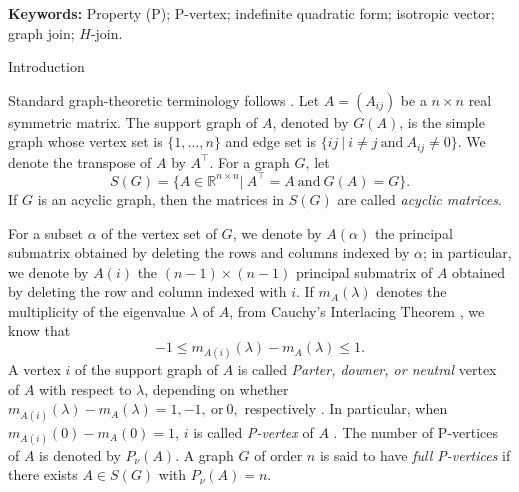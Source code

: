 \documentclass[12pt,reqno]{amsart}
\makeatletter
\theoremstyle{definition}
\numberwithin{equation}{subsection}
\numberwithin{equation}{section}
\def\section{\def\@secnumfont{\mdseries}\@startsection{section}{1}%
  \z@{.7\linespacing\@plus\linespacing}{.5\linespacing}%
  {\normalfont\scshape\centering}}
\makeatother
\begin{document}
\maketitle

\medskip

\noindent\textbf{Keywords:}
Property (P); P-vertex; indefinite quadratic form; isotropic vector; graph join; $H$-join.

\section{Introduction}

Standard graph-theoretic terminology follows \cite{west}. Let $A=(A_{ij})$ be a $n\times n$ real symmetric matrix. The support graph of $A$, denoted by $G(A)$, is the simple graph whose vertex set is $\{1,\dots,n\}$ and edge set is $\{ij \ | \ i \ne j \ \text{and} \ A_{ij}\ne 0\}$. We denote the transpose of $A$ by $A^\top$. For a graph $G$, let $$ S(G)=\{A\in\mathbb{R}^{n\times n}| \ A^\top=A\ \text{and}\ G(A)=G\}.$$  If $G$ is an acyclic graph, then the matrices in $S(G)$ are called \emph{acyclic matrices}.

For a subset $\alpha$ of the vertex set of $G$, we denote by $A(\alpha)$ the principal submatrix obtained by deleting the rows and columns indexed by $\alpha$; in particular, we denote by $A(i)$ the $(n-1)\times (n-1)$ principal submatrix of $A$ obtained by deleting the row and column indexed with $i$. 
If $m_A(\lambda)$ denotes the multiplicity of the eigenvalue $\lambda$ of $A$, from Cauchy's Interlacing Theorem \cite[Theorem 4.3.17]{inter}, we know that $$ -1 \le m_{A(i)}(\lambda) - m_{A}(\lambda) \le 1.$$
A vertex $i$ of the support graph of $A$ is called \emph{Parter, downer, or neutral} vertex of $A$ with respect to $\lambda$, depending on whether $m_{A(i)}(\lambda) - m_{A}(\lambda) = 1, -1,\ \text{or} \ 0,$ respectively \cite{Fiedler,hermitian}. In particular, when $m_{A(i)}(0) - m_{A}(0)=1$, $i$ is called \emph{P-vertex} of $A$ \cite{kim1}. The number of P-vertices of $A$ is denoted by $P_{\nu}(A)$. A graph $G$ of order $n$ is said to have \emph{full P-vertices} if there exists $A \in S(G)$ with $P_\nu(A)=n$. 

\end{document}
